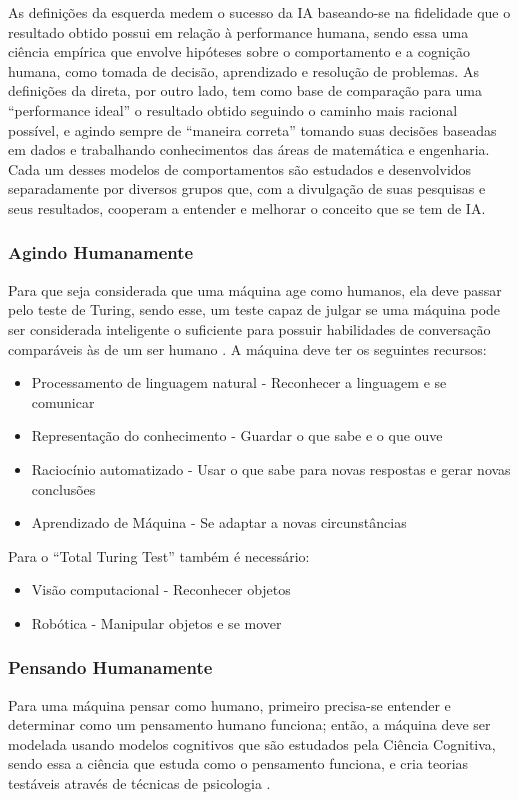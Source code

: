 \documentclass[
	12pt,				%
	openright,			%
	oneside,			%
	a4paper,			%
	english,			%
	spanish,			%
	brazil				%
	]{abntex2}
\begin{document}
	As definições da esquerda medem o sucesso da IA baseando-se na fidelidade que o resultado obtido possui em relação à performance humana, sendo essa uma ciência empírica que envolve hipóteses sobre o comportamento e a cognição humana, como tomada de decisão, aprendizado e resolução de problemas. As definições da direta, por outro lado, tem como base de comparação para uma ``performance ideal'' o resultado obtido seguindo o caminho mais racional possível, e agindo sempre de ``maneira correta'' tomando suas decisões baseadas em dados e trabalhando conhecimentos das áreas de matemática e engenharia. Cada um desses modelos de comportamentos são estudados e desenvolvidos separadamente por diversos grupos que, com a divulgação de suas pesquisas e seus resultados, cooperam a entender e melhorar o conceito que se tem de IA. \cite{norvig3rd}
	 
	\subsubsection*{Agindo Humanamente}
		Para que seja considerada que uma máquina age como humanos, ela deve passar pelo teste de Turing, sendo esse, um teste capaz de julgar se uma máquina pode ser considerada inteligente o suficiente para possuir habilidades de conversação comparáveis às de um ser humano \cite{turing}. A máquina deve ter os seguintes recursos:
		
		\begin{itemize}
  			\item Processamento de linguagem natural - Reconhecer a linguagem e se comunicar
  			\item Representação do conhecimento - Guardar o que sabe e o que ouve
  			\item Raciocínio automatizado - Usar o que sabe para novas respostas e gerar novas conclusões
  			\item Aprendizado de Máquina - Se adaptar a novas circunstâncias
  		\end{itemize}
  			
  			Para o ``Total Turing Test'' também é necessário:
  			
  		\begin{itemize}
  			\item Visão computacional - Reconhecer objetos
  			\item Robótica - Manipular objetos e se mover
		\end{itemize}
		
	\subsubsection*{Pensando Humanamente}
		Para uma máquina pensar como humano, primeiro precisa-se entender e determinar como um pensamento humano funciona; então, a máquina deve ser modelada usando modelos cognitivos que são estudados pela Ciência Cognitiva, sendo essa a ciência que estuda como o pensamento funciona, e cria teorias testáveis através de técnicas de psicologia \cite{wilson_keil}.
		
\end{document}
